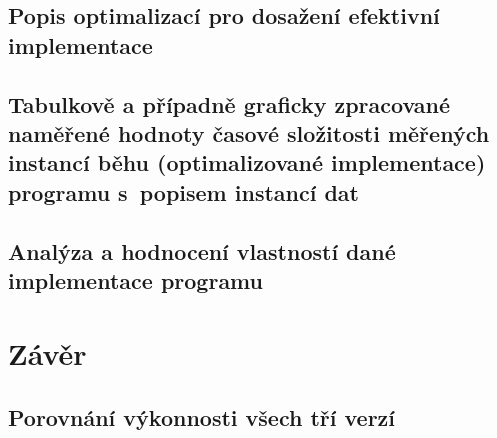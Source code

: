 \documentclass[12pt,a4paper]{article}
\begin{document}
\subsection{Popis optimalizací pro dosažení efektivní implementace}
\subsection{Tabulkově a případně graficky zpracované naměřené hodnoty časové složitosti měřených instancí běhu (optimalizované implementace) programu s~popisem instancí dat}
\subsection{Analýza a hodnocení vlastností dané implementace programu}

\section{Závěr}
\subsection{Porovnání výkonnosti všech tří verzí}
\end{document}
